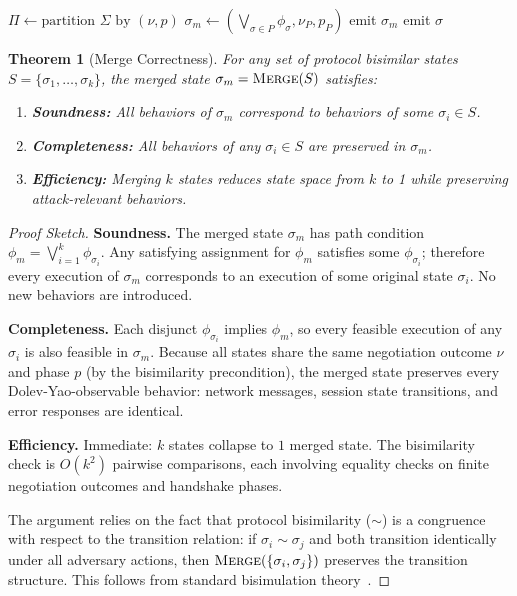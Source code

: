 \documentclass[10pt,twocolumn]{article}
\newtheorem{theorem}{Theorem}
\begin{document}
\begin{algorithm}[t]
\caption{Protocol-Aware Merge}
\label{alg:merge}
\begin{algorithmic}[1]
 
    \State $\Pi \gets \text{partition } \Sigma \text{ by } (\nu, p)$
            \State $\sigma_m \gets (\bigvee_{\sigma \in P} \phi_\sigma, \nu_P, p_P)$
            \State emit $\sigma_m$
        \Else
                \State emit $\sigma$ 
            \EndFor
        \EndIf
    \EndFor
\EndProcedure
\end{algorithmic}
\end{algorithm}

\begin{theorem}[Merge Correctness]
\label{thm:merge}
For any set of protocol bisimilar states $S = \{\sigma_1, \ldots, \sigma_k\}$, the merged state $\sigma_m = \textsc{Merge}(S)$ satisfies:
\begin{enumerate}[leftmargin=*,noitemsep]
\item \textbf{Soundness:} All behaviors of $\sigma_m$ correspond to behaviors of some $\sigma_i \in S$.
\item \textbf{Completeness:} All behaviors of any $\sigma_i \in S$ are preserved in $\sigma_m$.
\item \textbf{Efficiency:} Merging $k$ states reduces state space from $k$ to 1 while preserving attack-relevant behaviors.
\end{enumerate}
\end{theorem}

\begin{proof}[Proof Sketch]
\textbf{Soundness.}  The merged state $\sigma_m$ has path condition $\phi_m = \bigvee_{i=1}^{k} \phi_{\sigma_i}$.  Any satisfying assignment for $\phi_m$ satisfies some $\phi_{\sigma_i}$; therefore every execution of $\sigma_m$ corresponds to an execution of some original state $\sigma_i$.  No new behaviors are introduced.

\textbf{Completeness.}  Each disjunct $\phi_{\sigma_i}$ implies $\phi_m$, so every feasible execution of any $\sigma_i$ is also feasible in $\sigma_m$.  Because all states share the same negotiation outcome $\nu$ and phase $p$ (by the bisimilarity precondition), the merged state preserves every Dolev-Yao-observable behavior: network messages, session state transitions, and error responses are identical.

\textbf{Efficiency.}  Immediate: $k$ states collapse to $1$ merged state.  The bisimilarity check is $O(k^2)$ pairwise comparisons, each involving equality checks on finite negotiation outcomes and handshake phases.

The argument relies on the fact that protocol bisimilarity ($\sim$) is a congruence with respect to the transition relation: if $\sigma_i \sim \sigma_j$ and both transition identically under all adversary actions, then $\textsc{Merge}(\{\sigma_i, \sigma_j\})$ preserves the transition structure.  This follows from standard bisimulation theory~\cite{milner1989communication,kanellakis1990ccs}.
\end{proof}
\end{document}
